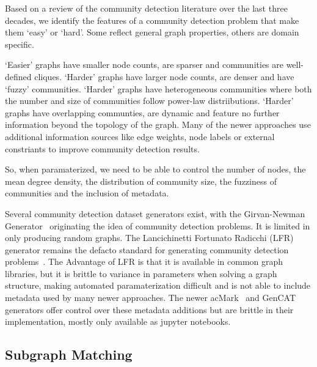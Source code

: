 Based on a review of the community detection literature over the last three decades, we identify the features of a community detection problem that make them `easy' or `hard'.
Some reflect general graph properties, others are domain specific. 

`Easier' graphs have smaller node counts, are sparser and communities are well-defined cliques. 
`Harder' graphs have larger node counts, are denser and have `fuzzy' communities. 
`Harder' graphs have heterogeneous communities where both the number and size of communities follow power-law distriibutions.
`Harder' graphs have overlapping communties, are dynamic and feature no further information beyond the topology of the graph.
Many of the newer approaches use additional information sources like edge weights, node labels or external constriants to improve community detection results. 

So, when paramaterized, we need to be able to control the number of nodes, the mean degree density, the distribution of community size, the fuzziness of communities and the inclusion of metadata.

Several community detection dataset generators exist, with the Girvan-Newman Generator~\cite{Girvan2002} originating the idea of community detection problems. 
It is limited in only producing random graphs. 
The Lancichinetti Fortunato Radicchi (LFR) generator remains the defacto standard for generating community detection problems~\cite{Lancichinetti2008}. 
The Advantage of LFR is that it is available in common graph libraries, but it is brittle to variance in parameters when solving a graph structure, making automated paramaterization difficult and is not able to include metadata used by many newer approaches. 
The newer acMark~\cite{Maekawa2019} and GenCAT~\cite{Maekawa2023} generators offer control over these metadata additions but are brittle in their implementation, mostly only available as jupyter notebooks. 



\subsection{Subgraph Matching}



